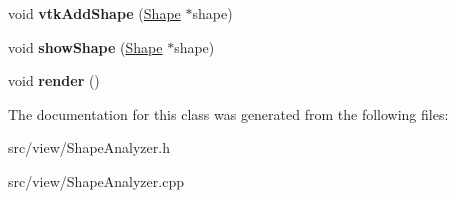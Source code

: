 \begin{DoxyCompactItemize}
\item 
\hypertarget{class_shape_analyzer_acb73f2981b546ea55f4a3e834133c055}{}void {\bfseries vtk\+Add\+Shape} (\hyperlink{class_shape}{Shape} $\ast$shape)\label{class_shape_analyzer_acb73f2981b546ea55f4a3e834133c055}

\item 
\hypertarget{class_shape_analyzer_a6224774de9e0dda3baef0ae4b35983ea}{}void {\bfseries show\+Shape} (\hyperlink{class_shape}{Shape} $\ast$shape)\label{class_shape_analyzer_a6224774de9e0dda3baef0ae4b35983ea}

\item 
\hypertarget{class_shape_analyzer_a954d54ae2c6db1eb4afa37baf0d66bcd}{}void {\bfseries render} ()\label{class_shape_analyzer_a954d54ae2c6db1eb4afa37baf0d66bcd}

\end{DoxyCompactItemize}


The documentation for this class was generated from the following files\+:\begin{DoxyCompactItemize}
\item 
src/view/Shape\+Analyzer.\+h\item 
src/view/Shape\+Analyzer.\+cpp\end{DoxyCompactItemize}
